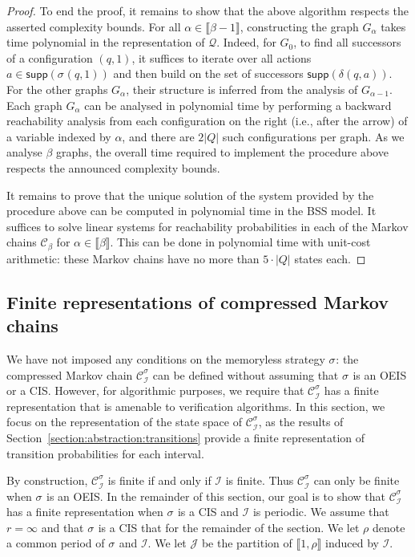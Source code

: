 \documentclass[a4paper,UKenglish,cleveref,autoref,thm-restate,colorlinks]{lipics-v2021}
\newcommand{\integerInterval}[1]{\llbracket{}#1\rrbracket{}}
\newcommand{\supp}[1]{\mathsf{supp}(#1)}
\newcommand{\graph}{G}
\newcommand{\ocmdp}{\mathcal{Q}}
\newcommand{\ocStateSpace}{Q}
\newcommand{\ocState}{q}
\newcommand{\ocAction}{a}
\newcommand{\ocTrans}{\delta}
\newcommand{\counterUB}{r}
\newcommand{\period}{\rho}
\newcommand{\mchain}{\mathcal{C}}
\newcommand{\intPart}{\mathcal{I}}
\newcommand{\intPartB}{\mathcal{J}}
\newcommand{\powerIndex}{\alpha}
\newcommand{\powerMax}{\beta}
\newcommand{\compressChainStrat}[1]{\mchain^{#1}_{\intPart}}
\newcommand{\compressChain}{\compressChainStrat{\strat}}
\newcommand{\stratGeneric}[1]{{\sigma_{#1}}}
\newcommand{\strat}{\stratGeneric{}}
\begin{document}
\begin{proof}
  To end the proof, it remains to show that the above algorithm respects the asserted complexity bounds.
  For all $\powerIndex\in\integerInterval{\powerMax-1}$, constructing the graph $\graph_\powerIndex$ takes time polynomial in the representation of $\ocmdp$.
  Indeed, for $\graph_0$, to find all successors of a configuration $(\ocState, 1)$, it suffices to iterate over all actions $\ocAction\in\supp{\strat(\ocState, 1)}$ and then build on the set of successors $\supp{\ocTrans(\ocState, \ocAction)}$.
  For the other graphs $\graph_\powerIndex$, their structure is inferred from the analysis of $\graph_{\powerIndex-1}$.
  Each graph $\graph_\powerIndex$ can be analysed in polynomial time by performing a backward reachability analysis from each configuration on the right (i.e., after the arrow) of a variable indexed by $\powerIndex$, and there are $2|\ocStateSpace|$ such configurations per graph.
  As we analyse $\powerMax$ graphs, the overall time required to implement the procedure above respects the announced complexity bounds.

  It remains to prove that the unique solution of the system provided by the procedure above can be computed in polynomial time in the BSS model.
  It suffices to solve linear systems for reachability probabilities in each of the Markov chains $\mchain_{\powerMax}$ for $\powerIndex\in\integerInterval{\powerMax}$.
  This can be done in polynomial time with unit-cost arithmetic: these Markov chains have no more than $5\cdot|\ocStateSpace|$ states each.
\end{proof}

\subsection{Finite representations of compressed Markov chains}\label{section:abstraction:finiteness}

We have not imposed any conditions on the memoryless strategy $\strat$: the compressed Markov chain $\compressChain$ can be defined without assuming that $\strat$ is an OEIS or a CIS.
However, for algorithmic purposes, we require that $\compressChain$ has a finite representation that is amenable to verification algorithms.
In this section, we focus on the representation of the state space of $\compressChain$, as the results of Section~\ref{section:abstraction:transitions} provide a finite representation of transition probabilities for each interval.

By construction, $\compressChain$ is finite if and only if $\intPart$ is finite.
Thus $\compressChain$ can only be finite when $\strat$ is an OEIS.
In the remainder of this section, our goal is to show that $\compressChain$ has a finite representation when $\strat$ is a CIS and $\intPart$ is periodic.
We assume that $\counterUB=\infty$ and that $\strat$ is a CIS that for the remainder of the section.
We let $\period$ denote a common period of $\strat$ and $\intPart$.
We let $\intPartB$ be the partition of $\integerInterval{1, \period}$ induced by $\intPart$.
\end{document}
